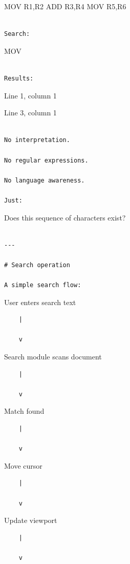 \documentclass[
  oneside,
  openany]{book}
\begin{document}
MOV R1,R2 ADD R3,R4 MOV R5,R6

\begin{verbatim}

Search:
\end{verbatim}

MOV

\begin{verbatim}

Results:
\end{verbatim}

Line 1, column 1

Line 3, column 1

\begin{verbatim}

No interpretation.

No regular expressions.

No language awareness.

Just:
\end{verbatim}

Does this sequence of characters exist?

\begin{verbatim}

---

# Search operation

A simple search flow:
\end{verbatim}

User enters search text

\begin{verbatim}
    |

    v
\end{verbatim}

Search module scans document

\begin{verbatim}
    |

    v
\end{verbatim}

Match found

\begin{verbatim}
    |

    v
\end{verbatim}

Move cursor

\begin{verbatim}
    |

    v
\end{verbatim}

Update viewport

\begin{verbatim}
    |

    v
\end{verbatim}
\end{document}
